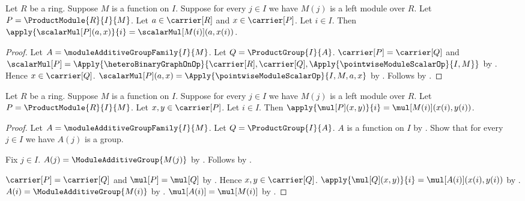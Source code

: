\begin{proposition}\label{product_module_scalar_coordinate}
    Let $R$ be a ring.
    Suppose $M$ is a function on $I$.
    Suppose for every $j\in I$ we have $M(j)$ is a left module over $R$.
    Let $P=\ProductModule{R}{I}{M}$.
    Let $a\in\carrier[R]$ and $x\in\carrier[P]$.
    Let $i\in I$.
    Then
        $\apply{\scalarMul[P](a,x)}{i}
            =\scalarMul[M(i)](a,x(i))$.
\end{proposition}
\begin{proof}
    Let $A=\moduleAdditiveGroupFamily{I}{M}$.
    Let $Q=\ProductGroup{I}{A}$.
    $\carrier[P]=\carrier[Q]$ and
        $\scalarMul[P]=\Apply{\heteroBinaryGraphOnOp}{
            \carrier[R],\carrier[Q],
            \Apply{\pointwiseModuleScalarOp}{I,M}}$ by
        .
    Hence $x\in\carrier[Q]$.
    $\scalarMul[P](a,x)
        =\Apply{\pointwiseModuleScalarOp}{I,M,a,x}$ by
        .
    Follows by .
\end{proof}

\begin{proposition}\label{product_module_add_coordinate}
    Let $R$ be a ring.
    Suppose $M$ is a function on $I$.
    Suppose for every $j\in I$ we have $M(j)$ is a left module over $R$.
    Let $P=\ProductModule{R}{I}{M}$.
    Let $x,y\in\carrier[P]$.
    Let $i\in I$.
    Then $\apply{\mul[P](x,y)}{i}=\mul[M(i)](x(i),y(i))$.
\end{proposition}
\begin{proof}
    Let $A=\moduleAdditiveGroupFamily{I}{M}$.
    Let $Q=\ProductGroup{I}{A}$.
    $A$ is a function on $I$ by
        .
    Show that for every $j\in I$ we have $A(j)$ is a group.
    \begin{subproof}
        Fix $j\in I$.
        $A(j)=\ModuleAdditiveGroup{M(j)}$ by
            .
        Follows by
            .
    \end{subproof}
    $\carrier[P]=\carrier[Q]$ and $\mul[P]=\mul[Q]$ by
        .
    Hence $x,y\in\carrier[Q]$.
    $\apply{\mul[Q](x,y)}{i}=\mul[A(i)](x(i),y(i))$ by
        .
    $A(i)=\ModuleAdditiveGroup{M(i)}$ by
        .
    $\mul[A(i)]=\mul[M(i)]$ by
        .
\end{proof}

